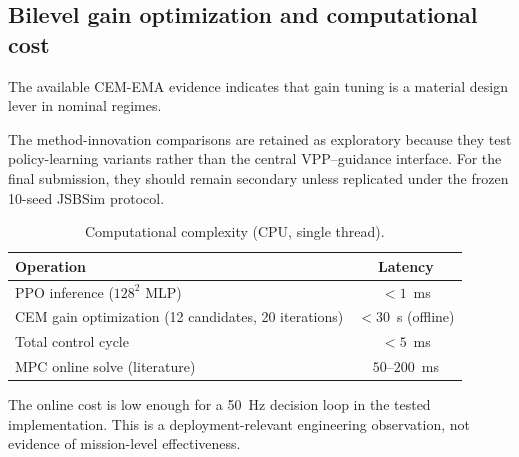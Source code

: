 \subsection{Bilevel gain optimization and computational cost}\label{sec:bilevel_gains}

The available CEM-EMA evidence indicates that gain tuning is a material design lever in nominal regimes.





The method-innovation comparisons are retained as exploratory because they test policy-learning variants rather than the central VPP--guidance interface. For the final submission, they should remain secondary unless replicated under the frozen 10-seed JSBSim protocol.

\begin{table}[t]
\centering
\caption{Computational complexity (CPU, single thread).}
\label{tab:timing}
\begin{tabular}{lc}
\toprule
Operation & Latency \\
\midrule
PPO inference ($128^2$ MLP) & $<1$~ms \\
CEM gain optimization (12 candidates, 20 iterations) & $<30$~s (offline) \\
Total control cycle & $<5$~ms \\
MPC online solve (literature) & $50$--$200$~ms \\
\bottomrule
\end{tabular}
\end{table}

The online cost is low enough for a 50~Hz decision loop in the tested implementation. This is a deployment-relevant engineering observation, not evidence of mission-level effectiveness.




